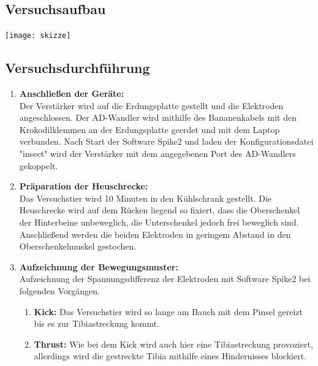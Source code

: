 \subsection{Versuchsaufbau}
\texttt{[image: skizze]}

\subsection{Versuchsdurchführung}
\begin{enumerate}
\item \textbf{Anschließen der Geräte:}\\ Der Verstärker wird auf die Erdungsplatte gestellt und die Elektroden angeschlossen. Der AD-Wandler wird mithilfe des Bananenkabels mit den Krokodilklemmen an der Erdungsplatte geerdet und mit dem Laptop verbunden. Nach Start der Software Spike2 und laden der Konfigurationsdatei "{}insect"{} wird der Verstärker mit dem angegebenen Port des AD-Wandlers gekoppelt.
\item \textbf{Präparation der Heuschrecke:}\\ Das Versuchstier wird 10 Minuten in den Kühlschrank gestellt. Die Heuschrecke wird auf dem Rücken liegend so fixiert, dass die Oberschenkel der Hinterbeine unbeweglich, die Unterschenkel jedoch frei beweglich sind. Anschließend werden die beiden Elektroden in geringem Abstand in den Oberschenkelmuskel gestochen. 
\item \textbf{Aufzeichnung der Bewegungsmuster:}\\
Aufzeichnung der Spannungsdifferenz der Elektroden mit Software Spike2 bei folgenden Vorgängen.
\begin{enumerate}
\item \textbf{Kick:} Das Versuchstier wird so lange am Bauch mit dem Pinsel gereizt bis es zur Tibiastreckung kommt. 
\item \textbf{Thrust:} Wie bei dem Kick wird auch hier eine Tibiastreckung provoziert, allerdings wird die gestreckte Tibia mithilfe eines Hindernisses blockiert. 
\end{enumerate}
\end{enumerate}

